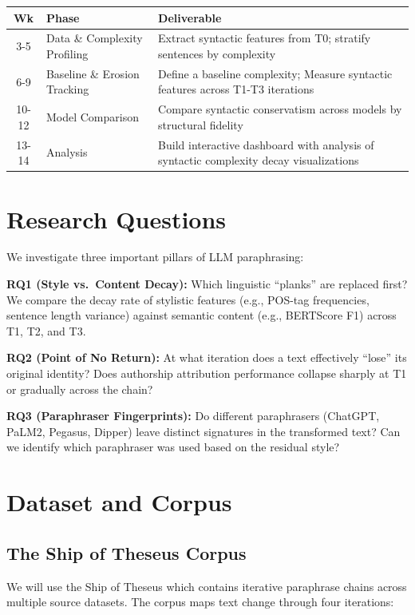 \documentclass[10pt,twocolumn]{article}
\begin{document}
\begin{table}[h]
\centering
\small
\begin{tabular}{@{}clp{3.8cm}@{}}
\toprule
\textbf{Wk} & \textbf{Phase} & \textbf{Deliverable} \\
\midrule
3-5 & Data \& Complexity Profiling & Extract syntactic features from T0; stratify sentences by complexity \\
6-9 & Baseline \& Erosion Tracking & Define a baseline complexity; Measure syntactic features across T1-T3 iterations \\
10-12 & Model Comparison & Compare syntactic conservatism across models by structural fidelity \\
13-14 & Analysis & Build interactive dashboard with analysis of syntactic complexity
decay visualizations \\
\bottomrule
\end{tabular}
\end{table}

\section{Research Questions}

We investigate three important pillars of LLM paraphrasing:

\textbf{RQ1 (Style vs.\ Content Decay):} Which linguistic ``planks'' are replaced
first? We compare the decay rate of stylistic features (e.g., POS-tag
frequencies, sentence length variance) against semantic content (e.g.,
BERTScore F1) across T1, T2, and T3.

\textbf{RQ2 (Point of No Return):} At what iteration does a text effectively
``lose'' its original identity? Does authorship attribution performance
collapse sharply at T1 or gradually across the chain?

\textbf{RQ3 (Paraphraser Fingerprints):} Do different paraphrasers (ChatGPT,
PaLM2, Pegasus, Dipper) leave distinct signatures in the transformed text?
Can we identify which paraphraser was used based on the residual style?

\section{Dataset and Corpus}

\subsection{The Ship of Theseus Corpus}
We will use the Ship of Theseus \cite{tripto2024} which contains iterative paraphrase chains across multiple source datasets. The corpus maps text change through four iterations:
\end{document}
